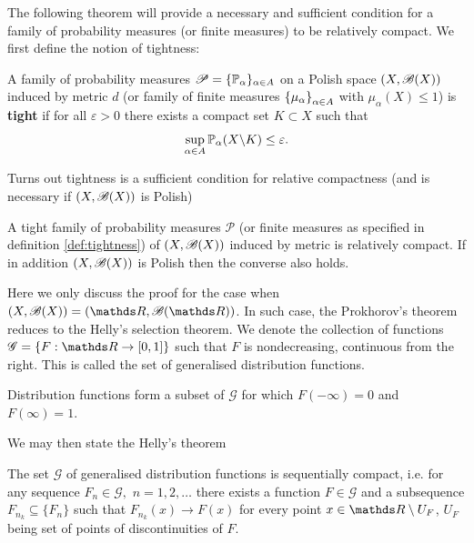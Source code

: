 The following theorem will provide a necessary and sufficient condition for a family of probability measures (or finite measures) to be relatively compact. We first define the notion of tightness:
\begin{definition}[Tightness] \label{def:tightness}
A family of probability measures $\mathcal{P} = \{ \mathbb{P}_\alpha\}_{\alpha \in A}$ on a Polish space $(X, \mathcal{B}(X))$ induced by metric $d$ (or family of finite measures $\left\{ \mu_\alpha \right \}_{\alpha \in A}$ with $\mu_\alpha(X) \leq 1$) is \textbf{tight} if for all $\varepsilon>0$ there exists a compact set $K \subset X$ such that
\begin{equation}
    \sup_{\alpha \in A} \mathbb{P}_\alpha (X \backslash K) \le \varepsilon.
\end{equation}
\end{definition}

Turns out tightness is a sufficient condition for relative compactness (and is necessary if $(X,\mathcal{B}(X))$ is Polish)
\begin{theorem}
A tight family of probability measures $\mathcal{P}$ (or finite measures as specified in definition \ref{def:tightness}) of $(X,\mathcal{B}(X))$ induced by metric is relatively compact. If in addition $(X,\mathcal{B}(X))$ is Polish then the converse also holds.
\end{theorem}

Here we only discuss the proof for the case when $(X,\B(X)) = (\R,\B(\R))$. In such case, the Prokhorov's theorem reduces to the Helly's selection theorem. We denote the collection of functions $\mathcal{G} = \{ F: \R \to [0,1] \}$ such that $F$ is nondecreasing, continuous from the right. This is called the set of generalised distribution functions. 

\begin{remark}
Distribution functions form a subset of $\mathcal{G}$ for which $F(-\infty) = 0$ and $F(\infty) = 1$.
\end{remark}

We may then state the Helly's theorem
\begin{theorem} \label{thm:Helly_selection}
The set $\mathcal{G}$ of generalised distribution functions is sequentially compact, i.e. for any sequence $F_n \in \mathcal{G},$ $n=1,2,\dots$ there exists a function $F \in \mathcal{G}$ and a subsequence $F_{n_k} \subseteq \{ F_n\}$ such that $F_{n_k}(x) \to F(x)$ for every point $x \in \R \setminus U_F$, $U_F$ being set of points of discontinuities of $F$.
\end{theorem}

